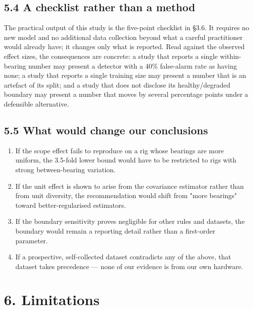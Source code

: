 \documentclass[11pt]{article}
\begin{document}
\subsection{5.4 A checklist rather than a method}

The practical output of this study is the five-point checklist in \S3.6. It requires no new model and no additional data collection beyond what a careful practitioner would already have; it changes only what is reported. Read against the observed effect sizes, the consequences are concrete: a study that reports a single within-bearing number may present a detector with a 40\% false-alarm rate as having none; a study that reports a single training size may present a number that is an artefact of its split; and a study that does not disclose its healthy/degraded boundary may present a number that moves by several percentage points under a defensible alternative.

\subsection{5.5 What would change our conclusions}

\begin{enumerate}
  \item If the scope effect fails to reproduce on a rig whose bearings are more uniform, the 3.5-fold lower bound would have to be restricted to rigs with strong between-bearing variation.
  \item If the unit effect is shown to arise from the covariance estimator rather than from unit diversity, the recommendation would shift from "more bearings" toward better-regularised estimators.
  \item If the boundary sensitivity proves negligible for other rules and datasets, the boundary would remain a reporting detail rather than a first-order parameter.
  \item If a prospective, self-collected dataset contradicts any of the above, that dataset takes precedence --- none of our evidence is from our own hardware.
\end{enumerate}



\section{6. Limitations}
\end{document}
